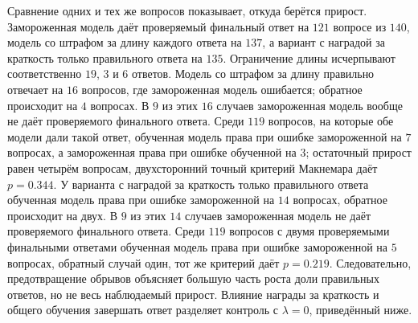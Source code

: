 \documentclass[11pt]{article}
\begin{document}
Сравнение одних и тех же вопросов показывает, откуда берётся прирост. Замороженная модель даёт проверяемый финальный ответ на $121$ вопросе из $140$, модель со штрафом за длину каждого ответа на $137$, а вариант с наградой за краткость только правильного ответа на $135$. Ограничение длины исчерпывают соответственно $19$, $3$ и $6$ ответов. Модель со штрафом за длину правильно отвечает на $16$ вопросов, где замороженная модель ошибается; обратное происходит на $4$ вопросах. В $9$ из этих $16$ случаев замороженная модель вообще не даёт проверяемого финального ответа. Среди $119$ вопросов, на которые обе модели дали такой ответ, обученная модель права при ошибке замороженной на $7$ вопросах, а замороженная права при ошибке обученной на $3$; остаточный прирост равен четырём вопросам, двухсторонний точный критерий Макнемара даёт $p=0.344$. У варианта с наградой за краткость только правильного ответа обученная модель права при ошибке замороженной на $14$ вопросах, обратное происходит на двух. В $9$ из этих $14$ случаев замороженная модель не даёт проверяемого финального ответа. Среди $119$ вопросов с двумя проверяемыми финальными ответами обученная модель права при ошибке замороженной на $5$ вопросах, обратный случай один, тот же критерий даёт $p=0.219$. Следовательно, предотвращение обрывов объясняет большую часть роста доли правильных ответов, но не весь наблюдаемый прирост. Влияние награды за краткость и общего обучения завершать ответ разделяет контроль с $\lambda=0$, приведённый ниже.
\end{document}
